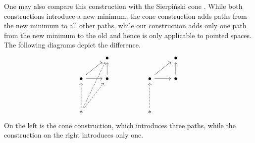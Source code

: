 One may also compare this construction with the Sierpi\'nski cone \cite{pugh_when_2025}. While both constructions introduce a new minimum, the cone construction adds paths from the new minimum to all other paths, while our construction adds only one path from the new minimum to the old and hence is only applicable to pointed spaces. The following diagrams depict the difference.
\[\begin{tikzcd}
    & \bullet &&& \bullet \\
    \bullet & \bullet && \bullet & \bullet \\
    \\
    {*} &&& {*}
    \arrow[from=2-1, to=1-2]
    \arrow[from=2-1, to=2-2]
    \arrow[from=2-2, to=1-2]
    \arrow[from=2-4, to=1-5]
    \arrow[from=2-4, to=2-5]
    \arrow[from=2-5, to=1-5]
    \arrow[dashed, from=4-1, to=1-2]
    \arrow[dashed, from=4-1, to=2-1]
    \arrow[dashed, from=4-1, to=2-2]
    \arrow[dashed, from=4-4, to=2-4]
\end{tikzcd}\]
On the left is the cone construction, which introduces three paths, while the construction on the right introduces only one.
